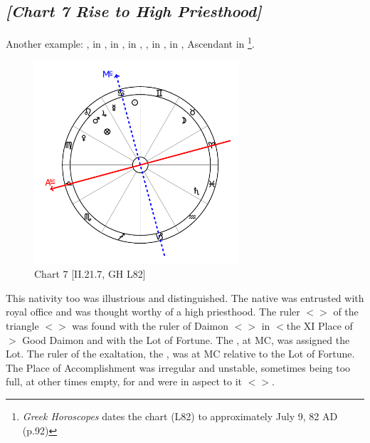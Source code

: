 \newpage
\subsection*{\textit{[Chart 7 Rise to High Priesthood]}}

Another example: \Sun, \Mercury\xspace in \Cancer, \Moon\xspace in \Taurus, \Saturn\xspace in \Pisces, \Jupiter, \Mars\xspace in \Leo, \Venus\xspace in \Virgo, Ascendant in \Libra \footnote{\textit{Greek Horoscopes} dates the chart (L82) to approximately July 9, 82 AD (p.92)}.

\clearpage
\begin{figure}
\centering
\vspace{-20pt}
\includegraphics[width=0.68\textwidth]{charts/2_21_7}
\caption{Chart 7 [II.21.7, GH L82]}
\label{fig:chart07}
\end{figure}

This nativity too was illustrious and distinguished. The native was entrusted with royal office and was thought worthy of a high priesthood. The ruler $<$\Mars$>$ of the triangle
$<$\Cancer\xspace \Scorpio\xspace \Pisces$>$ was found with the ruler of Daimon $<$\Jupiter$>$ in $<$the XI Place of$>$ Good Daimon and with the Lot of Fortune. The \Sun, at MC, was assigned the Lot. The ruler of the exaltation, the \Moon, was at MC relative to the Lot of Fortune. The Place of Accomplishment was irregular and unstable, sometimes being too full, at other times empty, for \Saturn\xspace and \Venus\xspace were in aspect to it $<$\Square$>$.

